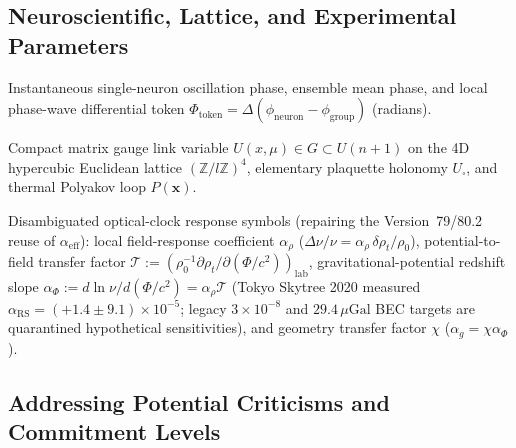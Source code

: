 \subsection*{Neuroscientific, Lattice, and Experimental Parameters}

\begin{description}[leftmargin=2.4cm, style=nextline]
  \item[$\phi_{\mathrm{neuron}},\,\phi_{\mathrm{group}},\,\Phi_{\mathrm{token}}$] Instantaneous single-neuron oscillation phase, ensemble mean phase, and local phase-wave differential token $\Phi_{\mathrm{token}} = \Delta(\phi_{\mathrm{neuron}} - \phi_{\mathrm{group}})$ (radians).
  \item[$U(x,\mu),\,U_\square,\,P(\mathbf{x})$] Compact matrix gauge link variable $U(x,\mu) \in G \subset U(n+1)$ on the 4D hypercubic Euclidean lattice $(\mathbb{Z}/l\mathbb{Z})^4$, elementary plaquette holonomy $U_\square$, and thermal Polyakov loop $P(\mathbf{x})$.
  \item[$\alpha_\rho,\,\mathcal{T},\,\alpha_\Phi,\,\chi$] Disambiguated optical-clock response symbols (repairing the Version~79/80.2 reuse of $\alpha_{\mathrm{eff}}$): local field-response coefficient $\alpha_\rho$ ($\Delta\nu/\nu = \alpha_\rho\,\delta\rho_t/\rho_0$), potential-to-field transfer factor $\mathcal{T} := (\rho_0^{-1}\partial\rho_t/\partial(\Phi/c^2))_{\mathrm{lab}}$, gravitational-potential redshift slope $\alpha_\Phi := d\ln\nu / d(\Phi/c^2) = \alpha_\rho\mathcal{T}$ (Tokyo Skytree 2020 measured $\alpha_{\mathrm{RS}} = (+1.4\pm 9.1)\times 10^{-5}$; legacy $3\times 10^{-8}$ and $29.4\,\mu\mathrm{Gal}$ BEC targets are quarantined hypothetical sensitivities), and geometry transfer factor $\chi$ ($\alpha_g = \chi\alpha_\Phi$).
\end{description}

\subsection{Addressing Potential Criticisms and Commitment Levels}

